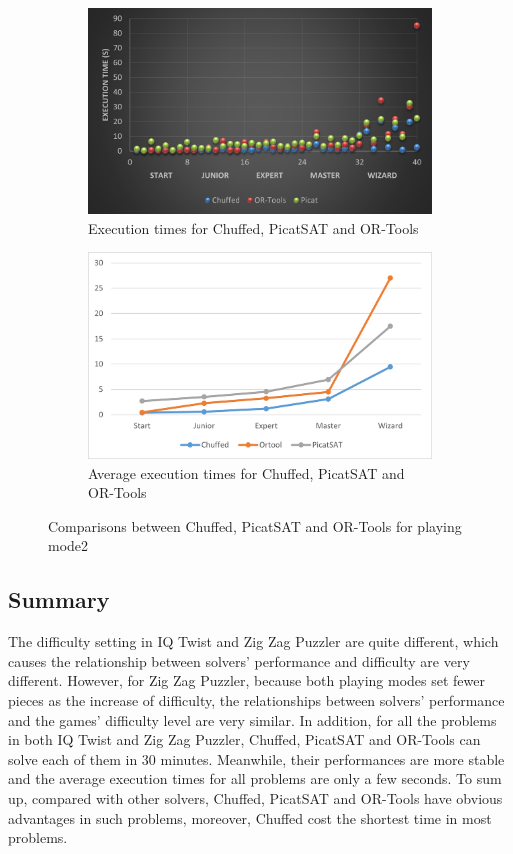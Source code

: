 \begin{figure}[H]
\begin{subfigure}[b]{0.48\textwidth}
  \centering
    \includegraphics[width=\textwidth]{figs/time2three.png}
    \caption{Execution times for Chuffed, PicatSAT and OR-Tools}
    \label{fig:compare}
\end{subfigure}
\begin{subfigure}[b]{0.48\textwidth}
 \centering
    \includegraphics[width=\textwidth]{figs/Threecomparison2.png}
    \caption{Average execution times for Chuffed, PicatSAT and OR-Tools}
    \label{fig:compare}
\end{subfigure}
\caption{Comparisons between Chuffed, PicatSAT and OR-Tools for playing mode2}
\label{fig:comparisonlast}
\end{figure}
\subsection{Summary}
\label{sec:Summary}
The difficulty setting in IQ Twist and Zig Zag Puzzler are quite different, which causes the relationship between solvers' performance and difficulty are very different. However, for Zig Zag Puzzler, because both playing modes set fewer pieces as the increase of difficulty, the relationships between solvers' performance and the games' difficulty level are very similar. In addition, for all the problems in both IQ Twist and Zig Zag Puzzler, Chuffed, PicatSAT and OR-Tools can solve each of them in 30 minutes. Meanwhile, their performances are more stable and the average execution times for all problems are only a few seconds. To sum up, compared with other solvers, Chuffed, PicatSAT and OR-Tools have obvious advantages in such problems, moreover, Chuffed cost the shortest time in most problems. 
 